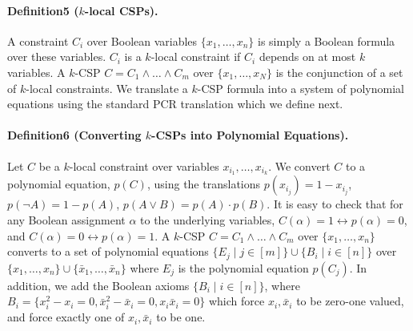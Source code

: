 \documentclass[10pt,a4paper]{article}
\begin{document}
\paragraph{Definition5 ($k$-local CSPs).}
A constraint $C_i$ over Boolean variables $\{x_1,\ldots,x_n\}$ is simply a Boolean formula over these variables. $C_i$ is a $k$-local constraint if $C_i$ depends on at most $k$ variables. A $k$-CSP $C=C_1\land\ldots\land C_m$ over $\{x_1,\ldots,x_N\}$ is the conjunction of a set of $k$-local constraints.
We translate a $k$-CSP formula into a system of polynomial equations using the standard PCR translation which we define next.
\paragraph{Definition6 (Converting $k$-CSPs into Polynomial Equations).}
Let $C$ be a $k$-local constraint over variables $x_{i_1},\ldots,x_{i_k}$. We convert $C$ to a polynomial equation, $p(C)$, using the translations $p(x_{i_j})=1-x_{i_j}$, $p(\neg A)=1-p(A)$, $p(A\lor B)=p(A)\cdot p(B)$. It is easy to check that for any Boolean assignment $\alpha$ to the underlying variables, $C(\alpha)=1\leftrightarrow p(\alpha)=0$, and $C(\alpha)=0\leftrightarrow p(\alpha)=1$.
A $k$-CSP $C=C_1\land\ldots\land C_m$ over $\{x_1,\ldots,x_n\}$ converts to a set of polynomial equations $\{E_j\mid j\in[m]\}\cup\{B_i\mid i\in[n]\}$ over $\{x_1,\ldots,x_n\}\cup\{\bar x_1,\ldots,\bar x_n\}$ where $E_j$ is the polynomial equation $p(C_j)$. In addition, we add the Boolean axioms $\{B_i\mid i\in[n]\}$, where $B_i=\{x_i^2-x_i=0,\bar x_i^2-\bar x_i=0,x_i\bar x_i=0\}$ which force $x_i,\bar x_i$ to be zero-one valued, and force exactly one of $x_i,\bar x_i$ to be one.
\end{document}
